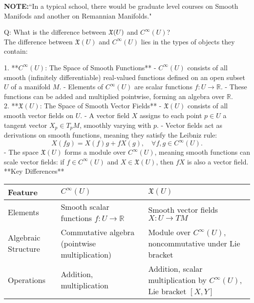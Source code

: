 \documentclass[10pt,a4paper]{report}
\begin{document}
\noindent\textbf{NOTE:}``In a typical school, there would be graduate level courses on Smooth Manifods and another  on Remannian Manifolds."

\newpage
Q: What is the difference between $\mathfrak{X}(U)$ and $C^\infty(U)$?\\


The difference between \( \mathfrak{X}(U) \) and \( C^\infty(U) \) lies in the types of objects they contain:

1. **\( C^\infty(U) \): The Space of Smooth Functions**
   - \( C^\infty(U) \) consists of all smooth (infinitely differentiable) real-valued functions defined on an open subset \( U \) of a manifold \( M \).
   - Elements of \( C^\infty(U) \) are scalar functions \( f: U \to \mathbb{R} \).
   - These functions can be added and multiplied pointwise, forming an algebra over \( \mathbb{R} \).\\

2. **\( \mathfrak{X}(U) \): The Space of Smooth Vector Fields**
   - \( \mathfrak{X}(U) \) consists of all smooth vector fields on \( U \).
   - A vector field \( X \) assigns to each point \( p \in U \) a tangent vector \( X_p \in T_pM \), smoothly varying with \( p \).
   - Vector fields act as derivations on smooth functions, meaning they satisfy the Leibniz rule:
     \[
     X(fg) = X(f) g + f X(g), \quad \forall f,g \in C^\infty(U).
     \]
   - The space \( \mathfrak{X}(U) \) forms a module over \( C^\infty(U) \), meaning smooth functions can scale vector fields: if \( f \in C^\infty(U) \) and \( X \in \mathfrak{X}(U) \), then \( fX \) is also a vector field.\\

**Key Differences**\\

\begin{tabular}{|l|l|p{6cm}|}
	\hline
	Feature & \( C^\infty(U) \) & \( \mathfrak{X}(U) \) \\
	\hline
	Elements & Smooth scalar functions \( f: U \to \mathbb{R} \) & Smooth vector fields \( X: U \to TM \) \\
	\hline
	Algebraic Structure & Commutative algebra (pointwise multiplication) & Module over \( C^\infty(U) \), noncommutative under Lie bracket \\
	\hline
	Operations & Addition, multiplication & Addition, scalar multiplication by \( C^\infty(U) \), Lie bracket \([X, Y]\) \\
	\hline
\end{tabular}\\
\end{document}
